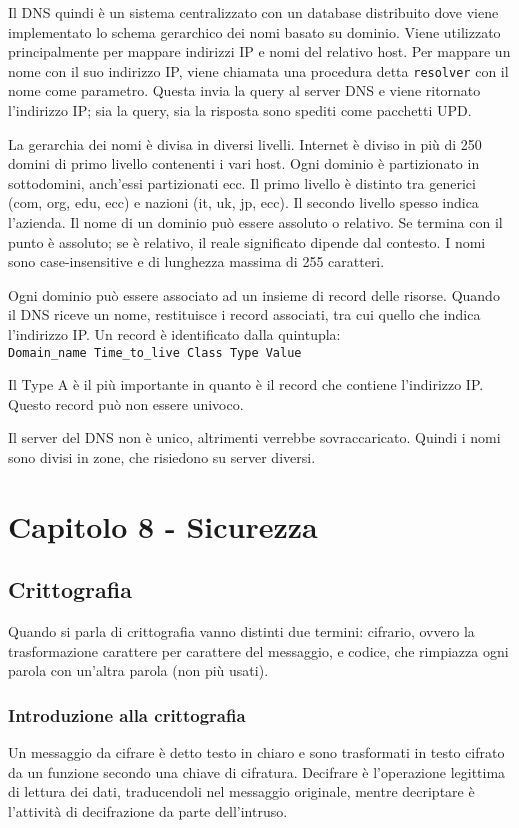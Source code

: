 Il DNS quindi è un sistema centralizzato con un database distribuito dove viene implementato lo schema gerarchico dei nomi basato su dominio. 
Viene utilizzato principalmente per mappare indirizzi IP e nomi del relativo host.
Per mappare un nome con il suo indirizzo IP, viene chiamata una procedura detta \texttt{resolver} con il nome come parametro.
Questa invia la query al server DNS e viene ritornato l'indirizzo IP; sia la query, sia la risposta sono spediti come pacchetti UPD.

La gerarchia dei nomi è divisa in diversi livelli. 
Internet è diviso in più di 250 domini di primo livello contenenti i vari host. 
Ogni dominio è partizionato in sottodomini, anch'essi partizionati ecc.
Il primo livello è distinto tra generici (com, org, edu, ecc) e nazioni (it, uk, jp, ecc).
Il secondo livello spesso indica l'azienda.
Il nome di un dominio può essere assoluto o relativo.
Se termina con il punto è assoluto; se è relativo, il reale significato dipende dal contesto.
I nomi sono case-insensitive e di lunghezza massima di 255 caratteri.

Ogni dominio può essere associato ad un insieme di record delle risorse.
Quando il DNS riceve un nome, restituisce i record associati, tra cui quello che indica l'indirizzo IP.
Un record è identificato dalla quintupla:\\
\texttt{Domain\_name Time\_to\_live Class Type Value}

Il Type A è il più importante in quanto è il record che contiene l'indirizzo IP. Questo record può non essere univoco.

Il server del DNS non è unico, altrimenti verrebbe sovraccaricato. Quindi i nomi sono divisi in zone, che risiedono su server diversi. 

\newpage
\section{Capitolo 8 - Sicurezza}

\subsection{Crittografia} %
Quando si parla di crittografia vanno distinti due termini: cifrario, ovvero la trasformazione carattere per carattere del messaggio, e codice, che rimpiazza ogni parola con un'altra parola (non più usati).

\subsubsection{Introduzione alla crittografia}
Un messaggio da cifrare è detto testo in chiaro e sono trasformati in testo cifrato da un funzione secondo una chiave di cifratura.
Decifrare è l'operazione legittima di lettura dei dati, traducendoli nel messaggio originale, mentre decriptare è l'attività di decifrazione da parte dell'intruso.

